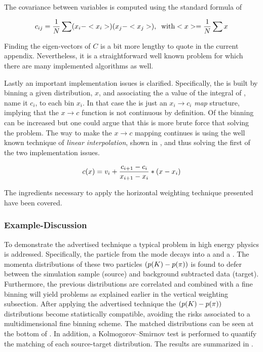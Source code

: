 \noindent The covariance between variables is computed using the standard formula of 

\begin{equation}
\centering
c_{ij} = \frac{1}{N} \sum (x_i-<x_i>)(x_j-<x_j>), \;\; \text {with} <x> = \frac{1}{N} \sum x \nonumber
\label{hor_reww_correlation_formula}
\end{equation}

\noindent Finding the eigen-vectors of $C$ is a bit more lengthy to quote in the current appendix.
Nevertheless, it is a straightforward well known problem for which there are many implemented
algorithms as well.

Lastly an important implementation issues is clarified. Specifically, the \cdf is built by binning a
given distribution, $x$, and associating the a value of the integral of , name it $c_i$,
to each bin $x_i$. In that case  the \cdf is just an $x_i \to c_i$ {\it map}
structure, implying that the $x \to c$ function is not continuous by definition. Of the binning can be increased
but one could argue that this is more brute force that solving the problem. The way to make the $x \to c$ mapping
continues is using the well known technique of {\it linear interpolation}, shown in ,
and thus solving the first of the two implementation issues.

\begin{equation}
  c(x) = v_i + \frac{c_{i+1}-c_i}{x_{i+1}-x_i} *  \left( x - x_i \right)
  \label{linear_interpolation}
\end{equation}

The ingredients necessary to apply the horizontal weighting technique presented have been covered.

\subsubsection{Example-Discussion}
To demonstrate the advertised technique a typical problem in high energy physics is addressed.
Specifically, the \Kstarz particle from the \BsJpsiKst mode decays into a \kaon and a \pion. The momenta
distributions of these two particles $\left( \mbox{$p$}(K)-\mbox{$p$}(\pi) \right)$ is found to defer between
the simulation sample (source) and background subtracted data (target).
Furthermore, the previous distributions are correlated and combined with a fine binning will yield problems as explained
earlier in the vertical weighting subsection. After applying the advertised technique the
$\left( \mbox{$p$}(K)-\mbox{$p$}(\pi) \right)$ distributions become statistically compatible, avoiding the risks associated
to a multidimensional fine binning scheme. The matched distributions can be seen at the bottom of .
In addition, a Kolmogorov–Smirnov test is performed to quantify the matching of each source-target distribution.
The results are summarized in .

